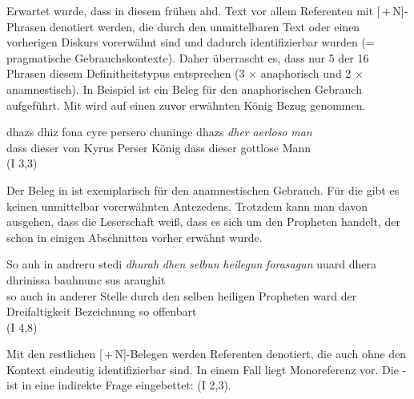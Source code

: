 Erwartet wurde, dass in diesem frühen ahd. Text vor allem Referenten mit [\,+\,N]-Phrasen  denotiert werden, die durch den unmittelbaren Text oder einen vorherigen Diskurs vorerwähnt sind und dadurch identifizierbar wurden  (=\,prag\-ma\-tische Gebrauchskontexte). Daher überrascht es, dass nur 5 der 16 Phrasen diesem Definitheitstypus entsprechen (3 $\times$ anaphorisch  und 2  $\times$ anamnestisch). In Beispiel  ist ein Beleg für den  anaphorischen Gebrauch  aufgeführt. Mit  wird auf einen  zuvor erwähnten König Bezug genommen.  

%

\begin{exe}
\ex \label{ex:I1051} \gll  dhazs dhiz fona cyre persero chuninge dhazs \textit{dher} \textit{aerloso} \textit{man} \\
{dass} {dieser} {von} {Kyrus} {Perser} {König} {dass} {dieser} {gottlose} {Mann} \\
\glt   {} (I 3,3)
\end{exe}

Der Beleg in  ist exemplarisch für den anamnestischen  Gebrauch. Für die   gibt es keinen unmittelbar vorerwähnten Antezedens. Trotzdem kann man davon ausgehen, dass die Leserschaft weiß, dass es sich um den Propheten handelt, der schon in einigen Abschnitten vorher erwähnt wurde.
%

\begin{exe}
\ex \label{ex:I2524} \gll So auh in andreru stedi \textit{dhurah} \textit{dhen} \textit{selbun} \textit{heilegun} \textit{forasagun} uuard dhera dhrinissa bauhnunc sus araughit  \\
{so} {auch} {in} {anderer} {Stelle} {durch} {den} {selben} {heiligen} {Propheten} {ward} {der} {Dreifaltigkeit} {Bezeichnung} {so} {offenbart} \\
\glt   {} (I 4,8)
\end{exe}

Mit den restlichen [\,+\,N]-Belegen werden Referenten denotiert, die auch ohne den Kontext eindeutig identifizierbar sind. In einem Fall liegt Monoreferenz vor. Die - ist in eine indirekte Frage eingebettet:   (I 2,3). 

